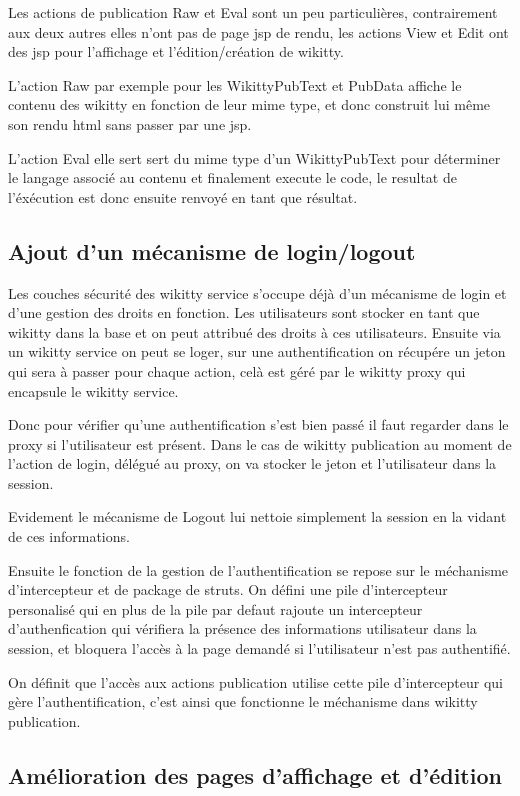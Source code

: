 Les actions de publication Raw et Eval sont un peu particulières, contrairement
aux deux autres elles n'ont pas de page jsp de rendu, les actions View et Edit
ont des jsp pour l'affichage et l'édition/création de wikitty.

L'action Raw par exemple pour les WikittyPubText et PubData affiche le contenu
des wikitty en fonction de leur mime type, et donc construit lui même son rendu
html sans passer par une jsp.

L'action Eval elle sert sert du mime type d'un WikittyPubText pour déterminer le
langage associé au contenu et finalement execute le code, le resultat de
l'éxécution est donc ensuite renvoyé en tant que résultat.


\subsection{Ajout d'un mécanisme de login/logout}

Les couches sécurité des wikitty service s'occupe déjà d'un mécanisme de login
et d'une gestion des droits en fonction. Les utilisateurs sont stocker en tant
que wikitty dans la base et on peut attribué des droits à ces utilisateurs.
Ensuite via un wikitty service on peut se loger, sur une authentification on
récupére un jeton qui sera à passer pour chaque action, celà est géré par le
wikitty proxy qui encapsule le wikitty service.

Donc pour vérifier qu'une authentification s'est bien passé il faut regarder
dans le proxy si l'utilisateur est présent. Dans le cas de wikitty publication
au moment de l'action de login, délégué au proxy, on va stocker le jeton et
l'utilisateur dans la session.

Evidement le mécanisme de Logout lui nettoie simplement la session en la vidant
de ces informations.

Ensuite le fonction de la gestion de l'authentification se repose sur le
méchanisme d'intercepteur et de package de struts. On défini une pile
d'intercepteur personalisé qui en plus de la pile par defaut rajoute un
intercepteur d'authenfication qui vérifiera la présence des informations
utilisateur dans la session, et bloquera l'accès à la page demandé si
l'utilisateur n'est pas authentifié.

On définit que l'accès aux actions publication utilise cette pile d'intercepteur
qui gère l'authentification, c'est ainsi que fonctionne le méchanisme dans
wikitty publication.

\subsection{Amélioration des pages d'affichage et d'édition}

